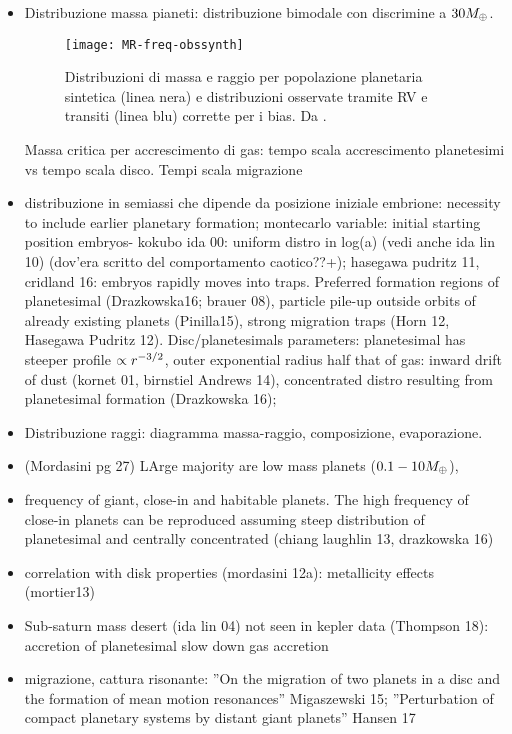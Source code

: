 \begin{workout}
\begin{itemize}
		\item Distribuzione massa pianeti: distribuzione bimodale con discrimine a $30M_{\oplus}{}$.
		\begin{figure}[!ht]\texttt{[image: MR-freq-obssynth]}\caption{Distribuzioni di massa e raggio per popolazione planetaria sintetica (linea nera) e distribuzioni osservate tramite RV e transiti (linea blu) corrette per i bias. Da \cite{mordasini2018planetary}.}\label{fig:MR-freq-obssynth}\end{figure}
		Massa critica per accrescimento di gas: tempo scala accrescimento planetesimi vs tempo scala disco.
		Tempi scala migrazione
		\item distribuzione in semiassi che dipende da posizione iniziale embrione: necessity to include earlier planetary formation; montecarlo variable: initial starting position embryos- kokubo ida 00: uniform distro in log(a) (vedi anche ida lin 10) (dov'era scritto del comportamento caotico??+); hasegawa pudritz 11, cridland 16: embryos rapidly moves into traps.
		Preferred formation regions of planetesimal (Drazkowska16; brauer 08), particle pile-up outside orbits of already existing planets (Pinilla15), strong migration traps (Horn 12, Hasegawa Pudritz 12).
		Disc/planetesimals parameters: planetesimal has steeper profile $\propto r^{-3/2}$, outer exponential radius half that of gas: inward drift of dust (kornet 01, birnstiel Andrews 14), concentrated distro resulting from planetesimal formation (Drazkowska 16);
		\item Distribuzione raggi: diagramma massa-raggio, composizione, evaporazione.
		\item (Mordasini pg 27) LArge majority are low mass planets ($0.1-10M_{\oplus}{}$), 
		\item frequency of giant, close-in and habitable planets. The high frequency of close-in planets can be reproduced assuming steep distribution of planetesimal and centrally concentrated (chiang laughlin 13, drazkowska 16)
		\item correlation with disk properties (mordasini 12a): metallicity effects (mortier13)
		\item Sub-saturn mass desert (ida lin 04) not seen in kepler data (Thompson 18): accretion of planetesimal slow down gas accretion
		\item migrazione, cattura risonante: ''On the migration of two planets in a disc and the formation of mean motion resonances'' Migaszewski 15; ''Perturbation of compact planetary systems by distant giant planets'' Hansen 17
	\end{itemize}
\end{workout}

